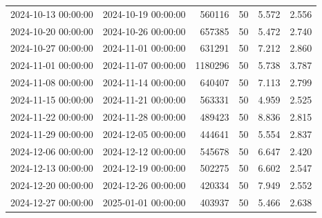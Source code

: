 \begin{tabular}{llrrrr}
2024-10-13 00:00:00 & 2024-10-19 00:00:00 & 560116 & 50 & 5.572 & 2.556 \\
2024-10-20 00:00:00 & 2024-10-26 00:00:00 & 657385 & 50 & 5.472 & 2.740 \\
2024-10-27 00:00:00 & 2024-11-01 00:00:00 & 631291 & 50 & 7.212 & 2.860 \\
2024-11-01 00:00:00 & 2024-11-07 00:00:00 & 1180296 & 50 & 5.738 & 3.787 \\
2024-11-08 00:00:00 & 2024-11-14 00:00:00 & 640407 & 50 & 7.113 & 2.799 \\
2024-11-15 00:00:00 & 2024-11-21 00:00:00 & 563331 & 50 & 4.959 & 2.525 \\
2024-11-22 00:00:00 & 2024-11-28 00:00:00 & 489423 & 50 & 8.836 & 2.815 \\
2024-11-29 00:00:00 & 2024-12-05 00:00:00 & 444641 & 50 & 5.554 & 2.837 \\
2024-12-06 00:00:00 & 2024-12-12 00:00:00 & 545678 & 50 & 6.647 & 2.420 \\
2024-12-13 00:00:00 & 2024-12-19 00:00:00 & 502275 & 50 & 6.602 & 2.547 \\
2024-12-20 00:00:00 & 2024-12-26 00:00:00 & 420334 & 50 & 7.949 & 2.552 \\
2024-12-27 00:00:00 & 2025-01-01 00:00:00 & 403937 & 50 & 5.466 & 2.638 \\
\bottomrule
\end{tabular}
